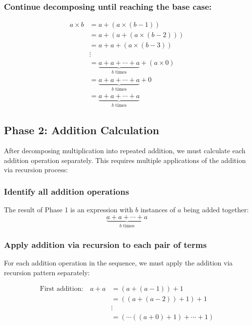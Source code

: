 \documentclass{article}
\begin{document}
\subsubsection{Continue decomposing until reaching the base case:}
\[
    \begin{aligned}
        a \times b & = a + (a \times (b-1))                                             \\
                   & = a + (a + (a \times (b-2)))                                       \\
                   & = a + a + (a \times (b-3))                                         \\
                   & \vdots                                                             \\
                   & = \underbrace{a + a + \cdots + a}_{b \text{ times}} + (a \times 0) \\
                   & = \underbrace{a + a + \cdots + a}_{b \text{ times}} + 0            \\
                   & = \underbrace{a + a + \cdots + a}_{b \text{ times}}
    \end{aligned}
\]

\subsection{Phase 2: Addition Calculation}
After decomposing multiplication into repeated addition, we must calculate each addition operation separately. This requires multiple applications of the addition via recursion process:

\subsubsection{Identify all addition operations}
The result of Phase 1 is an expression with \(b\) instances of \(a\) being added together:
\[
    \underbrace{a + a + \cdots + a}_{b \text{ times}}
\]

\subsubsection{Apply addition via recursion to each pair of terms}
For each addition operation in the sequence, we must apply the addition via recursion pattern separately:

\[
    \begin{aligned}
        \text{First addition:} \quad a + a & = (a + (a-1)) + 1                    \\
                                           & = ((a + (a-2)) + 1) + 1              \\
                                           & \vdots                               \\
                                           & = (\cdots((a + 0) + 1) + \cdots + 1)
    \end{aligned}
\]
\end{document}
